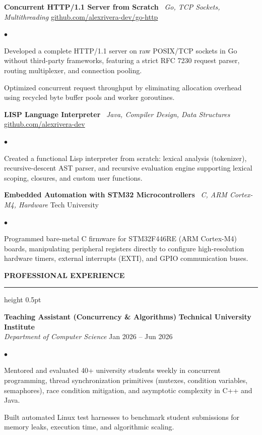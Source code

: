 \documentclass[10pt,letterpaper]{article}
\newcommand{\resumesection}[1]{%
  \vspace{2pt}%
  {\color{primary}\normalsize\bfseries\MakeUppercase{#1}}%
  \vspace{1pt}\hrule height 0.5pt\vspace{2pt}%
}
\renewenvironment{itemize}{%
  \begin{list}{\color{primary}$\bullet$}{%
    \setlength{\leftmargin}{1.1em}%
    \setlength{\itemsep}{0.5pt}%
    \setlength{\topsep}{1pt}%
    \setlength{\parsep}{0pt}%
    \setlength{\partopsep}{0pt}%
  }%
}{%
  \end{list}%
}
\begin{document}
\vspace{1.5pt}

\textbf{Concurrent HTTP/1.1 Server from Scratch} \textbar\ \textit{Go, TCP Sockets, Multithreading} \hfill \href{https://github.com/alexrivera-dev/go-http}{github.com/alexrivera-dev/go-http}
\begin{itemize}
    \item Developed a complete HTTP/1.1 server on raw POSIX/TCP sockets in Go without third-party frameworks, featuring a strict RFC 7230 request parser, routing multiplexer, and connection pooling.
    \item Optimized concurrent request throughput by eliminating allocation overhead using recycled byte buffer pools and worker goroutines.
\end{itemize}

\vspace{1.5pt}

\textbf{LISP Language Interpreter} \textbar\ \textit{Java, Compiler Design, Data Structures} \hfill \href{https://github.com/alexrivera-dev}{github.com/alexrivera-dev}
\begin{itemize}
    \item Created a functional Lisp interpreter from scratch: lexical analysis (tokenizer), recursive-descent AST parser, and recursive evaluation engine supporting lexical scoping, closures, and custom user functions.
\end{itemize}

\vspace{1.5pt}

\textbf{Embedded Automation with STM32 Microcontrollers} \textbar\ \textit{C, ARM Cortex-M4, Hardware} \hfill Tech University
\begin{itemize}
    \item Programmed bare-metal C firmware for STM32F446RE (ARM Cortex-M4) boards, manipulating peripheral registers directly to configure high-resolution hardware timers, external interrupts (EXTI), and GPIO communication buses.
\end{itemize}

\resumesection{Professional Experience}

\textbf{Teaching Assistant (Concurrency \& Algorithms)} \hfill \textbf{Technical University Institute} \\
\textit{Department of Computer Science} \hfill Jan 2026 -- Jun 2026
\begin{itemize}
    \item Mentored and evaluated 40+ university students weekly in concurrent programming, thread synchronization primitives (mutexes, condition variables, semaphores), race condition mitigation, and asymptotic complexity in C++ and Java.
    \item Built automated Linux test harnesses to benchmark student submissions for memory leaks, execution time, and algorithmic scaling.
\end{itemize}
\end{document}
